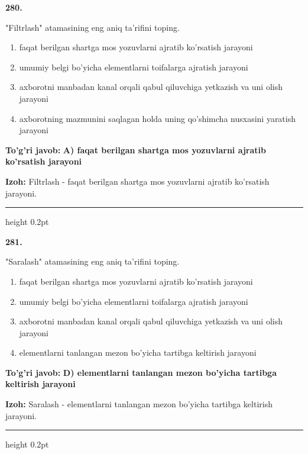 \documentclass[10pt,a4paper,oneside]{article}
\begin{document}
\noindent\textbf{\color{ink}280.}
\par
"Filtrlash" atamasining eng aniq ta'rifini toping.
\begin{enumerate}[label=\Alph*),leftmargin=9mm]
\item faqat berilgan shartga mos yozuvlarni ajratib ko'rsatish jarayoni
\item umumiy belgi bo'yicha elementlarni toifalarga ajratish jarayoni
\item axborotni manbadan kanal orqali qabul qiluvchiga yetkazish va uni olish jarayoni
\item axborotning mazmunini saqlagan holda uning qo'shimcha nusxasini yaratish jarayoni
\end{enumerate}
\begin{tcolorbox}[enhanced,breakable,colback=teal!4,colframe=teal!50!black,boxrule=0.5pt,arc=1.1mm,left=3mm,right=3mm,top=1.7mm,bottom=1.7mm,before skip=2mm,after skip=2mm]
\textbf{\color{teal}To'g'ri javob:} \textbf{A) faqat berilgan shartga mos yozuvlarni ajratib ko'rsatish jarayoni}
\par\smallskip
\textbf{Izoh:} Filtrlash - faqat berilgan shartga mos yozuvlarni ajratib ko'rsatish jarayoni.
\end{tcolorbox}
\vspace{2mm}\hrule height 0.2pt \vspace{3mm}

\noindent\textbf{\color{ink}281.}
\par
"Saralash" atamasining eng aniq ta'rifini toping.
\begin{enumerate}[label=\Alph*),leftmargin=9mm]
\item faqat berilgan shartga mos yozuvlarni ajratib ko'rsatish jarayoni
\item umumiy belgi bo'yicha elementlarni toifalarga ajratish jarayoni
\item axborotni manbadan kanal orqali qabul qiluvchiga yetkazish va uni olish jarayoni
\item elementlarni tanlangan mezon bo'yicha tartibga keltirish jarayoni
\end{enumerate}
\begin{tcolorbox}[enhanced,breakable,colback=teal!4,colframe=teal!50!black,boxrule=0.5pt,arc=1.1mm,left=3mm,right=3mm,top=1.7mm,bottom=1.7mm,before skip=2mm,after skip=2mm]
\textbf{\color{teal}To'g'ri javob:} \textbf{D) elementlarni tanlangan mezon bo'yicha tartibga keltirish jarayoni}
\par\smallskip
\textbf{Izoh:} Saralash - elementlarni tanlangan mezon bo'yicha tartibga keltirish jarayoni.
\end{tcolorbox}
\vspace{2mm}\hrule height 0.2pt \vspace{3mm}
\end{document}
